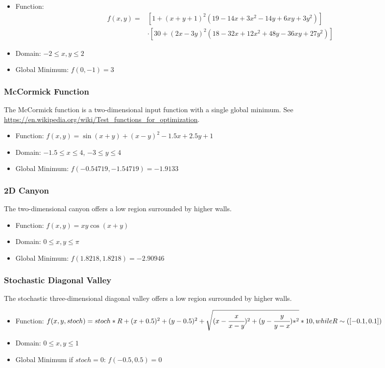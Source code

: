 \begin{itemize}
  \item Function:
    \begin{align}
      f(x,y) =& \left[1+(x+y+1)^2\left(19-14x+3x^2-14y+6xy+3y^2\right)\right] \\ \nonumber
        & \cdot\left[30+(2x-3y)^2(18-32x+12x^2+48y-36xy+27y^2)\right]
    \end{align}
  \item Domain: $-2 \leq x,y \leq 2$
  \item Global Minimum: $f(0,-1)=3$
\end{itemize}

\subsubsection{McCormick Function}
The McCormick function is a two-dimensional input function with a single global minimum.
See \url{https://en.wikipedia.org/wiki/Test_functions_for_optimization}.

\begin{itemize}
  \item Function: $f(x,y) = \sin(x+y) + (x-y)^2 - 1.5x + 2.5y + 1$
  \item Domain: $-1.5 \leq x \leq 4$, $-3 \leq y \leq 4$
  \item Global Minimum: $f(-0.54719,-1.54719) = -1.9133$
\end{itemize}

\subsubsection{2D Canyon}
The two-dimensional canyon offers a low region surrounded by higher walls.

\begin{itemize}
  \item Function: $f(x,y) = xy\cos(x+y)$
  \item Domain: $0 \leq x,y \leq \pi$
  \item Global Minimum: $f(1.8218,1.8218)=-2.90946$
\end{itemize}

\subsubsection{Stochastic Diagonal Valley}
The stochastic three-dimensional diagonal valley offers a low region surrounded by higher walls.

\begin{itemize}
  \item Function: $f(x,y,stoch) = stoch * R + (x+0.5)^2 + (y-0.5)^2 + \sqrt{(x - \cfrac{x}{x-y})^2 + (y - \cfrac{y}{y-x})*^2} * 10, while R\sim ([-0.1,0.1])$
  \item Domain: $0 \leq x,y \leq 1$
  \item Global Minimum if $stoch =0$: $f(-0.5,0.5)=0$
\end{itemize}


